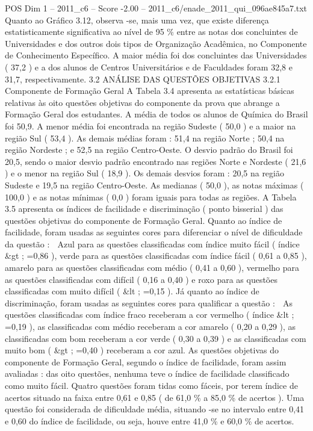 \begin{textsample}{POS Dim 1 – 2011\_c6 – Score -2.00 – 2011\_c6/enade\_2011\_qui\_096ae845a7.txt}
Quanto ao Gráfico 3.12, observa -se, mais uma vez, que existe diferença estatisticamente significativa ao nível de 95 \% entre as notas dos concluintes de Universidades e dos outros dois tipos de Organização Acadêmica, no Componente de Conhecimento Específico.
A maior média foi dos concluintes das Universidades ( 37,2 ) e a dos alunos de Centros Universitários e de Faculdades foram 32,8 e 31,7, respectivamente. 3.2 ANÁLISE DAS QUESTÕES OBJETIVAS 3.2.1 Componente de Formação Geral A Tabela 3.4 apresenta as estatísticas básicas relativas às oito questões objetivas do componente da prova que abrange a Formação Geral dos estudantes.
A média de todos os alunos de Química do Brasil foi 50,9.
A menor média foi encontrada na região Sudeste ( 50,0 ) e a maior na região Sul ( 53,4 ).
As demais médias foram : 51,4 na região Norte ; 50,4 na região Nordeste ; e 52,5 na região Centro-Oeste.
O desvio padrão do Brasil foi 20,5, sendo o maior desvio padrão encontrado nas regiões Norte e Nordeste ( 21,6 ) e o menor na região Sul ( 18,9 ).
Os demais desvios foram : 20,5 na região Sudeste e 19,5 na região Centro-Oeste.
As medianas ( 50,0 ), as notas máximas ( 100,0 ) e as notas mínimas ( 0,0 ) foram iguais para todas as regiões.
A Tabela 3.5 apresenta os índices de facilidade e discriminação ( ponto bisserial ) das questões objetivas do componente de Formação Geral.
Quanto ao índice de facilidade, foram usadas as seguintes cores para diferenciar o nível de dificuldade da questão :  Azul para as questões classificadas com índice muito fácil ( índice \&gt ; =0,86 ), verde para as questões classificadas com índice fácil ( 0,61 a 0,85 ), amarelo para as questões classificadas com médio ( 0,41 a 0,60 ), vermelho para as questões classificadas com difícil ( 0,16 a 0,40 ) e roxo para as questões classificadas com muito difícil ( \&lt ; =0,15 ).
Já quanto ao índice de discriminação, foram usadas as seguintes cores para qualificar a questão :  As questões classificadas com índice fraco receberam a cor vermelho ( índice \&lt ; =0,19 ), as classificadas com médio receberam a cor amarelo ( 0,20 a 0,29 ), as classificadas com bom receberam a cor verde ( 0,30 a 0,39 ) e as classificadas com muito bom ( \&gt ; =0,40 ) receberam a cor azul.
As questões objetivas do componente de Formação Geral, segundo o índice de facilidade, foram assim avaliadas : das oito questões, nenhuma teve o índice de facilidade classificado como muito fácil.
Quatro questões foram tidas como fáceis, por terem índice de acertos situado na faixa entre 0,61 e 0,85 ( de 61,0 \% a 85,0 \% de acertos ).
Uma questão foi considerada de dificuldade média, situando -se no intervalo entre 0,41 e 0,60 do índice de facilidade, ou seja, houve entre 41,0 \% e 60,0 \% de acertos.

\end{textsample}
